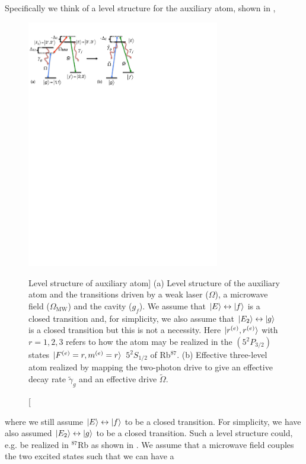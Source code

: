 Specifically we think of a level structure for the auxiliary atom, shown in
,
\begin{figure} 
\centering
\includegraphics[width=0.75\textwidth]{./figs_Borregaard_PRL2015/figure4}
\caption
[Level structure of auxiliary atom]
{(a) Level
structure of the auxiliary atom and the transitions driven by a weak laser ($\Omega$), a microwave field ($\Omega_{\text{MW}}$) and the cavity ($g_{f}$). We assume that
$| E \rangle\leftrightarrow| f \rangle$ is a closed transition and, for simplicity, we
also assume that $| E_{2} \rangle\leftrightarrow| g \rangle$ is a closed transition but
this is not a necessity. Here $| r^{(e)},r^{(e)} \rangle$ with $r=1,2,3$ refers to
how the atom may be realized in the $(5^{2}P_{3/2})$ states
$| F^{(e)}=r,m^{(e)}=r \rangle$ $5^{2}S_{1/2}$ of Rb${}^{87}$. (b) Effective
three-level atom realized by mapping the two-photon drive to give an effective
decay rate $\tilde{\gamma}_{g}$ and an effective drive $\tilde{\Omega}$. }
\label{fig:control}
\end{figure} 
where we still assume $| E \rangle\leftrightarrow| f \rangle$ to be a closed transition.
For simplicity, we have also assumed $| E_{2} \rangle\leftrightarrow| g \rangle$ to be a
closed transition. Such a level structure could,
e.g. be realized in  ${}^{87}$Rb  as shown in .  We assume
that a microwave field couples the two excited states such that we can have a
